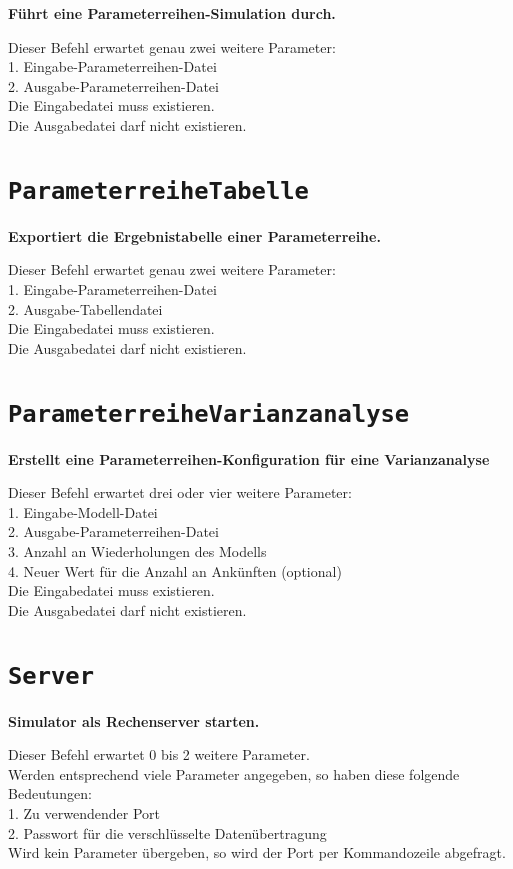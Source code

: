 \textbf{Führt eine Parameterreihen-Simulation durch.}

Dieser Befehl erwartet genau zwei weitere Parameter:\\
1. Eingabe-Parameterreihen-Datei\\
2. Ausgabe-Parameterreihen-Datei\\
Die Eingabedatei muss existieren.\\
Die Ausgabedatei darf nicht existieren.

\section{\texttt{ParameterreiheTabelle}}

\textbf{Exportiert die Ergebnistabelle einer Parameterreihe.}

Dieser Befehl erwartet genau zwei weitere Parameter:\\
1. Eingabe-Parameterreihen-Datei\\
2. Ausgabe-Tabellendatei\\
Die Eingabedatei muss existieren.\\
Die Ausgabedatei darf nicht existieren.

\section{\texttt{ParameterreiheVarianzanalyse}}

\textbf{Erstellt eine Parameterreihen-Konfiguration für eine Varianzanalyse}

Dieser Befehl erwartet drei oder vier weitere Parameter:\\
1. Eingabe-Modell-Datei\\
2. Ausgabe-Parameterreihen-Datei\\
3. Anzahl an Wiederholungen des Modells\\
4. Neuer Wert für die Anzahl an Ankünften (optional)\\
Die Eingabedatei muss existieren.\\
Die Ausgabedatei darf nicht existieren.

\section{\texttt{Server}}

\textbf{Simulator als Rechenserver starten.}

Dieser Befehl erwartet 0 bis 2 weitere Parameter.\\
Werden entsprechend viele Parameter angegeben, so haben diese folgende Bedeutungen:\\
1. Zu verwendender Port\\
2. Passwort für die verschlüsselte Datenübertragung\\
Wird kein Parameter übergeben, so wird der Port per Kommandozeile abgefragt.

